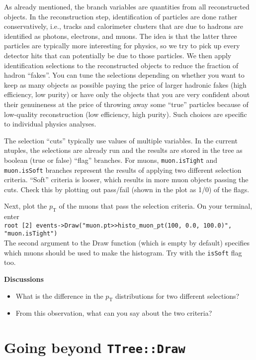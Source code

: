 \documentclass[12pt]{article}
\newcommand{\rterminal}[2]{\vspace{3pt}\texttt{root [#1] #2} \\}
\newcommand{\pt}{\ensuremath{p_{\mathrm{T}}}\xspace}
\newenvironment{discussions}{%
\vspace{0.2in}%
\textbf{Discussions}%
\begin{itemize}%
}{%
\end{itemize}%
}
\begin{document}
As already mentioned, the branch variables are quantities from all reconstructed objects. In the reconstruction step, identification of particles are done rather conservatively, i.e., tracks and calorimeter clusters that are due to hadrons are identified as photons, electrons, and muons. The idea is that the latter three particles are typically more interesting for physics, so we try to pick up every detector hits that can potentially be due to those particles. We then apply identification selections to the reconstructed objects to reduce the fraction of hadron ``fakes''. You can tune the selections depending on whether you want to keep as many objects as possible paying the price of larger hadronic fakes (high efficiency, low purity) or have only the objects that you are very confident about their genuineness at the price of throwing away some ``true'' particles because of low-quality reconstruction (low efficiency, high purity). Such choices are specific to individual physics analyses.

The selection ``cuts'' typically use values of multiple variables. In the current ntuples, the selections are already run and the results are stored in the tree as boolean (true or false) ``flag'' branches. For muons, \texttt{muon.isTight} and \texttt{muon.isSoft} branches represent the results of applying two different selection criteria. ``Soft'' criteria is looser, which results in more muon objects passing the cuts. Check this by plotting out pass/fail (shown in the plot as 1/0) of the flags.

Next, plot the \pt of the muons that pass the selection criteria. On your terminal, enter \\
\rterminal{2}{events->Draw("muon.pt>>histo\_muon\_pt(100, 0.0, 100.0)", "muon.isTight")}
The second argument to the Draw function (which is empty by default) specifies which muons should be used to make the histogram. Try with the \texttt{isSoft} flag too.

\begin{discussions}
\item What is the difference in the \pt distributions for two different selections?
\item From this observation, what can you say about the two criteria?
\end{discussions}

\section{Going beyond \texttt{TTree::Draw}}
\end{document}
